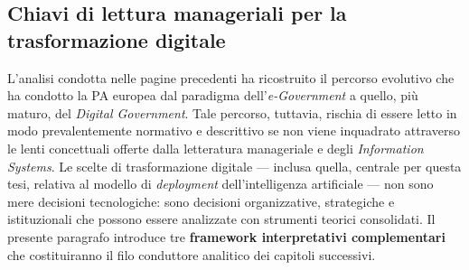 %
%



\subsection{Chiavi di lettura manageriali per la trasformazione digitale}
\label{subsec:chiavi-manageriali}

L'analisi condotta nelle pagine precedenti ha ricostruito il percorso evolutivo che ha condotto la PA europea dal paradigma dell'\textit{e-Government} a quello, più maturo, del \textit{Digital Government}. Tale percorso, tuttavia, rischia di essere letto in modo prevalentemente normativo e descrittivo se non viene inquadrato attraverso le lenti concettuali offerte dalla letteratura manageriale e degli \textit{Information Systems}. Le scelte di trasformazione digitale --- inclusa quella, centrale per questa tesi, relativa al modello di \textit{deployment} dell'intelligenza artificiale --- non sono mere decisioni tecnologiche: sono decisioni organizzative, strategiche e istituzionali che possono essere analizzate con strumenti teorici consolidati. Il presente paragrafo introduce tre \textbf{framework interpretativi complementari} che costituiranno il filo conduttore analitico dei capitoli successivi.

